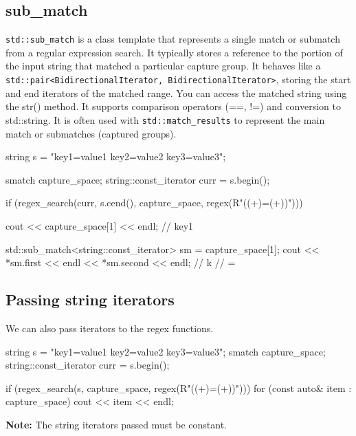 \documentclass{report}
\begin{document}
    \subsection{sub\_match}
    \bigbreak \noindent 
    \texttt{std::sub\_match} is a class template that represents a single match or submatch from a regular expression search. It typically stores a reference to the portion of the input string that matched a particular capture group.
    \bigbreak \noindent 
    It behaves like a \texttt{std::pair<BidirectionalIterator, BidirectionalIterator>}, storing the start and end iterators of the matched range.
    \bigbreak \noindent 
    You can access the matched string using the str() method.
    \bigbreak \noindent 
    It supports comparison operators (==, !=) and conversion to std::string.
    \bigbreak \noindent 
    It is often used with \texttt{std::match\_results} to represent the main match or submatches (captured groups).
    \bigbreak \noindent 
    \begin{cppcode}
        string s = "key1=value1 key2=value2 key3=value3";

        smatch capture_space;
        string::const_iterator curr = s.begin();

        if (regex_search(curr, s.cend(), capture_space, regex(R"(\s*(\w+)=(\w+)\s*)"))) {
            cout << capture_space[1] << endl; // key1

            std::sub_match<string::const_iterator> sm = capture_space[1];
            cout << *sm.first << endl << *sm.second << endl; 
            // k
            // =
        }
    \end{cppcode}

    \pagebreak 
    \subsection{Passing string iterators}
    \bigbreak \noindent 
    We can also pass iterators to the regex functions.
    \bigbreak \noindent 
    \begin{cppcode}
        string s = "key1=value1 key2=value2 key3=value3";
        smatch capture_space;
        string::const_iterator curr = s.begin();

        if (regex_search(s, capture_space, regex(R"(\s*(\w+)=(\w+)\s*)"))) {
            for (const auto& item : capture_space) {
                cout << item << endl;
            }
        }
    \end{cppcode}
    \bigbreak \noindent 
    \textbf{Note:} The string iterators passed must be constant.
    \bigbreak \noindent 
\end{document}
